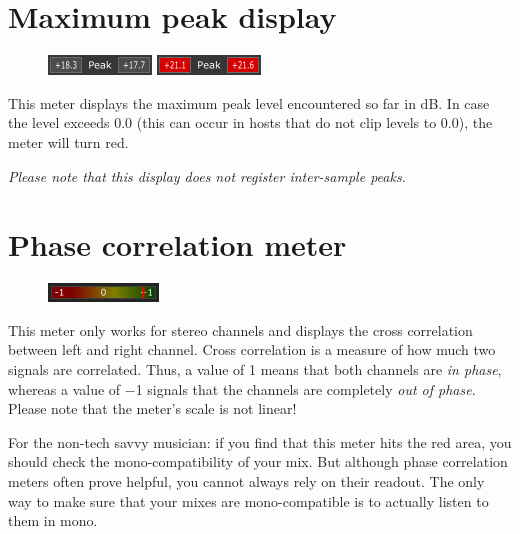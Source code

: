 \section{Maximum peak display}

\begin{figure}
  \includegraphics[scale=\screenshotscale,clip]{include/images/maximum_peak_normal.png}
  \newline \vspace{-0.9\baselineskip}
  \includegraphics[scale=\screenshotscale,clip]{include/images/maximum_peak_clipped.png}
\end{figure}

This meter displays the maximum peak level encountered so far in
\si{\dB}.  In case the level exceeds \SI{0.0}{\dBFS} (this can occur
in hosts that do not clip levels to \SI{0.0}{\dBFS}), the meter will
turn red.

\emph{Please note that this display does not register inter-sample
  peaks.}

\section{Phase correlation meter}

\begin{figure}
  \includegraphics[scale=\screenshotscale,clip]{include/images/phase_correlation_meter.png}
\end{figure}

This meter only works for stereo channels and displays the cross
correlation between left and right channel.  Cross correlation is a
measure of how much two signals are correlated.  Thus, a value of
\num[retainplus]{+1} means that both channels are \emph{in phase},
whereas a value of \num{-1} signals that the channels are completely
\emph{out of phase}.  Please note that the meter's scale is not
linear!

For the non-tech savvy musician: if you find that this meter hits the
red area, you should check the mono-compatibility of your mix.  But
although phase correlation meters often prove helpful, you cannot
always rely on their readout.  The only way to make sure that your
mixes are mono-compatible is to actually listen to them in mono.

